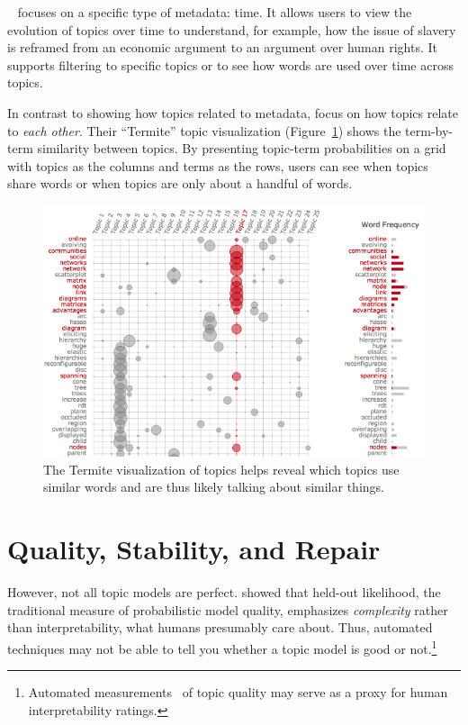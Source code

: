 ~\citep{eistenstein-14} focuses on a specific type of metadata: time.
It allows users to view the evolution of topics over time to understand, for
example, how the issue of slavery is reframed from an economic argument to an
argument over human rights.  It supports filtering to specific topics or to see
how words are used over time across topics.

In contrast to showing how topics related to metadata,
\citet{chuang-12} focus on how topics relate to \emph{each other}.
Their ``Termite'' topic visualization (Figure~\ref{fig:termite}) shows
the term-by-term similarity between topics.  By presenting topic-term
probabilities on a grid with topics as the columns and terms as the
rows, users can see when topics share words or when topics are only
about a handful of words.

\begin{figure}
  \includegraphics[width=.9\linewidth]{figures/viz_termite}
  \caption{The Termite visualization of topics helps reveal which
    topics use similar words and are thus likely talking about similar
    things.}
  \label{fig:termite}
\end{figure}

\section{Quality, Stability, and Repair}
\label{sec:coherence}

However, not all topic models are perfect.  \citet{chang-09b} showed that
held-out likelihood, the traditional measure of probabilistic model quality,
emphasizes \emph{complexity} rather than interpretability, what humans
presumably care about.  Thus, automated techniques may not be able to tell you
whether a topic model is good or not.\footnote{Automated
  measurements~\citep{newman-10,mimno-11,lau-14} of topic quality may serve as a
  proxy for human interpretability ratings.}

